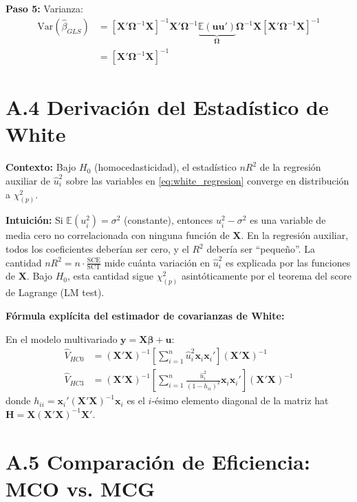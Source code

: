 \documentclass[12pt,a4paper]{report}
\theoremstyle{definition}
\theoremstyle{remark}
\newcommand{\E}{\mathbb{E}}
\newcommand{\Var}{\mathrm{Var}}
\newcommand{\betahat}{\hat{\beta}}
\newcommand{\uhat}{\hat{u}}
\begin{document}
\textbf{Paso 5:} Varianza:
\begin{align*}
  \Var(\betahat_{GLS}) &= [\mathbf{X}'\boldsymbol{\Omega}^{-1}\mathbf{X}]^{-1} \mathbf{X}'\boldsymbol{\Omega}^{-1} \underbrace{\E(\mathbf{u}\mathbf{u}')}_{\boldsymbol{\Omega}} \boldsymbol{\Omega}^{-1}\mathbf{X} [\mathbf{X}'\boldsymbol{\Omega}^{-1}\mathbf{X}]^{-1}\\
  &= [\mathbf{X}'\boldsymbol{\Omega}^{-1}\mathbf{X}]^{-1}
\end{align*}

\section*{A.4 Derivación del Estadístico de White}

\textbf{Contexto:} Bajo $H_0$ (homocedasticidad), el estadístico $n R^2$ de la regresión auxiliar de $\uhat_i^2$ sobre las variables en \eqref{eq:white_regresion} converge en distribución a $\chi^2_{(p)}$.

\textbf{Intuición:} Si $\E(u_i^2) = \sigma^2$ (constante), entonces $u_i^2 - \sigma^2$ es una variable de media cero no correlacionada con ninguna función de $\mathbf{X}$. En la regresión auxiliar, todos los coeficientes deberían ser cero, y el $R^2$ debería ser ``pequeño''. La cantidad $n R^2 = n \cdot \frac{\text{SCE}}{\text{SCT}}$ mide cuánta variación en $\uhat_i^2$ es explicada por las funciones de $\mathbf{X}$. Bajo $H_0$, esta cantidad sigue $\chi^2_{(p)}$ asintóticamente por el teorema del score de Lagrange (LM test).

\textbf{Fórmula explícita del estimador de covarianzas de White:}

En el modelo multivariado $\mathbf{y} = \mathbf{X}\boldsymbol{\beta} + \mathbf{u}$:
\begin{align}
  \widehat{V}_{HC0} &= (\mathbf{X}'\mathbf{X})^{-1} \left[\sum_{i=1}^n \uhat_i^2 \mathbf{x}_i\mathbf{x}_i'\right] (\mathbf{X}'\mathbf{X})^{-1} \tag{A.2}\\
  \widehat{V}_{HC3} &= (\mathbf{X}'\mathbf{X})^{-1} \left[\sum_{i=1}^n \frac{\uhat_i^2}{(1-h_{ii})^2} \mathbf{x}_i\mathbf{x}_i'\right] (\mathbf{X}'\mathbf{X})^{-1} \tag{A.3}
\end{align}
donde $h_{ii} = \mathbf{x}_i'(\mathbf{X}'\mathbf{X})^{-1}\mathbf{x}_i$ es el $i$-ésimo elemento diagonal de la matriz hat $\mathbf{H} = \mathbf{X}(\mathbf{X}'\mathbf{X})^{-1}\mathbf{X}'$.

\section*{A.5 Comparación de Eficiencia: MCO vs. MCG}
\end{document}
